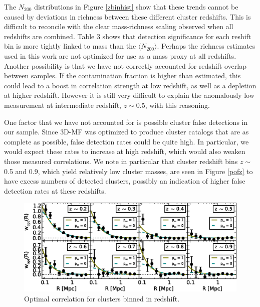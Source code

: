 The $N_{200}$ distributions in Figure \ref{zbinhist} show that these trends cannot be caused by deviations in richness between these different cluster redshifts. This is difficult to reconcile with the clear mass-richness scaling observed when all redshifts are combined. Table 3 shows that detection significance for each reshift bin is more tightly linked to mass than the $\langle N_{200} \rangle$. Perhaps the richness estimates used in this work are not optimized for use as a mass proxy at all redshifts. Another possibility is that we have not correctly accounted for redshift overlap between samples. If the contamination fraction is higher than estimated, this could lead to a boost in correlation strength at low redshift, as well as a depletion at higher redshift. However it is still very difficult to explain the anomalously low measurement at intermediate redshift, $z \sim$0.5, with this reasoning.

One factor that we have not accounted for is possible cluster false detections in our sample. Since \ac{3D-MF} was optimized to produce cluster catalogs that are as complete as possible, false detection rates could be quite high. In particular, we would expect these rates to increase at high redshift, which would also weaken those measured correlations. We note in particular that cluster redshift bins $z \sim$ 0.5 and 0.9, which yield relatively low cluster masses, are seen in Figure \ref{pofz} to have excess numbers of detected clusters, possibly an indication of higher false detection rates at these redshifts.


\begin{figure}
\begin{center}
\includegraphics[scale=0.9]{plots_ch3/wopt_z_panels_U.eps}
\caption[Magnification for Redshift-Binned Clusters]{Optimal correlation for clusters binned in redshift.}
\label{zbinw}
\end{center}
\end{figure}


